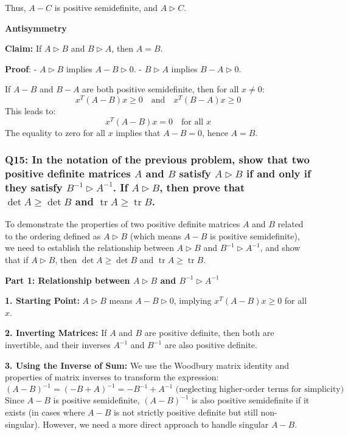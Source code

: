\documentclass[8pt]{article}
\begin{document}
Thus, \(A - C\) is positive semidefinite, and \(A \triangleright C\).

\textbf{Antisymmetry}

\textbf{Claim:} If \(A \triangleright B\) and \(B \triangleright A\), then \(A = B\).

\textbf{Proof}:
- \(A \triangleright B\) implies \(A - B \triangleright 0\).
- \(B \triangleright A\) implies \(B - A \triangleright 0\).

If \(A - B\) and \(B - A\) are both positive semidefinite, then for all \(x \neq 0\):
\[
x^T (A - B) x \geq 0 \quad \text{and} \quad x^T (B - A) x \geq 0
\]
This leads to:
\[
x^T (A - B) x = 0 \quad \text{for all } x
\]
The equality to zero for all \(x\) implies that \(A - B = 0\), hence \(A = B\).

\subsubsection*{Q15: In the notation of the previous problem, show that two positive definite matrices \(A\) and \(B\) satisfy \(A \triangleright B\) if and only if they satisfy \(B^{-1} \triangleright A^{-1}\). If \(A \triangleright B\), then prove that \(\det A \geq \det B\) and \(\operatorname{tr} A \geq \operatorname{tr} B\).}

To demonstrate the properties of two positive definite matrices \(A\) and \(B\) related to the ordering defined as \(A \triangleright B\) (which means \(A - B\) is positive semidefinite), we need to establish the relationship between \(A \triangleright B\) and \(B^{-1} \triangleright A^{-1}\), and show that if \(A \triangleright B\), then \(\det A \geq \det B\) and \(\operatorname{tr} A \geq \operatorname{tr} B\).

\textbf{Part 1: Relationship between \(A \triangleright B\) and \(B^{-1} \triangleright A^{-1}\)}

\textbf{1. Starting Point:}
   \(A \triangleright B\) means \(A - B \triangleright 0\), implying \(x^T (A - B) x \geq 0\) for all \(x\).

\textbf{2. Inverting Matrices:}
   If \(A\) and \(B\) are positive definite, then both are invertible, and their inverses \(A^{-1}\) and \(B^{-1}\) are also positive definite.

\textbf{3. Using the Inverse of Sum:}
   We use the Woodbury matrix identity and properties of matrix inverses to transform the expression:
   \[
   (A - B)^{-1} = (-B + A)^{-1} = -B^{-1} + A^{-1} \text{ (neglecting higher-order terms for simplicity)}
   \]
   Since \(A - B\) is positive semidefinite, \((A - B)^{-1}\) is also positive semidefinite if it exists (in cases where \(A - B\) is not strictly positive definite but still non-singular). However, we need a more direct approach to handle singular \(A-B\).
\end{document}
